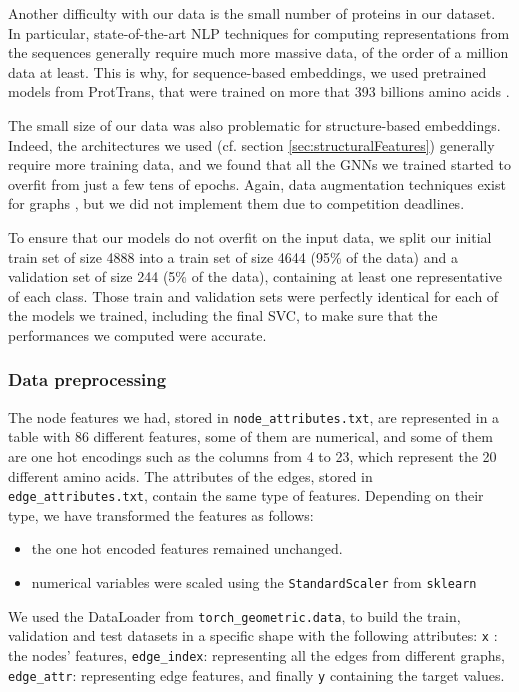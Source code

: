 \documentclass[final]{cvpr}
\begin{document}
Another difficulty with our data is the small number of proteins in our dataset. In particular, state-of-the-art NLP techniques for computing representations from the sequences generally require much more massive data, of the order of a million data at least. This is why, for sequence-based embeddings, we used pretrained models from ProtTrans, that were trained on more that 393 billions amino acids \cite{protTrans}. 

The small size of our data was also problematic for structure-based embeddings. Indeed, the architectures we used (cf. section \ref{sec:structuralFeatures}) generally require more training data, and we found that all the GNNs we trained started to overfit from just a few tens of epochs. Again, data augmentation techniques exist for graphs \cite{Zhao2020}, but we did not implement them due to competition deadlines. 

To ensure that our models do not overfit on the input data, we split our initial train set of size 4888 into a train set of size 4644 (95\% of the data) and a validation set of size 244 (5\% of the data), containing at least one representative of each class. Those train and validation sets were perfectly identical for each of the models we trained, including the final SVC, to make sure that the performances we computed were accurate. 

\subsubsection{Data preprocessing}

The node features we had, stored in \texttt{node\_attributes.txt}, are represented in a table with 86 different features, some of them are numerical, and some of them are one hot encodings such as the columns from 4 to 23, which represent the 20 different amino acids. The attributes of the edges, stored in \texttt{edge\_attributes.txt}, contain the same type of features. Depending on their type, we have transformed the features as follows:
\begin{itemize}
    \item the one hot encoded features remained unchanged.
    \item numerical variables were scaled using the \texttt{StandardScaler} from \texttt{sklearn}
\end{itemize}

We used the DataLoader from \texttt{torch\_geometric.data}, to build the train, validation and test datasets in a specific shape with the following attributes: \texttt{x} : the nodes' features, \texttt{edge\_index}: representing all the edges from different graphs, \texttt{edge\_attr}: representing edge features, and finally \texttt{y} containing the target values.
\end{document}

